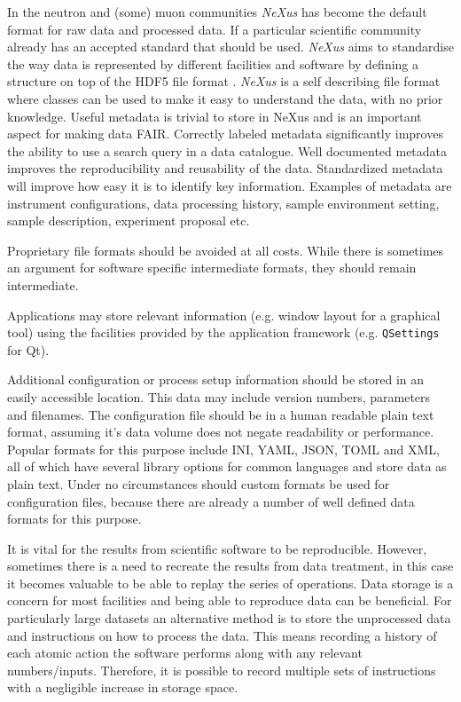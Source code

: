 \documentclass[jnr]{iosart2x}
\begin{document}
In the neutron and (some) muon communities {\it NeXus} \cite{K_nnecke_2015} has become the default format for raw data and processed data.
If a particular scientific community already has an accepted standard that should be used.
{\it NeXus} aims to standardise the way data is represented by different facilities and software by defining a structure on top of the HDF5 file format \cite{HDF5}.
{\it NeXus} is a self describing file format where classes can be used to make it easy to understand the data, with no prior knowledge.
Useful metadata is trivial to store in NeXus and is an important aspect for making data FAIR.
Correctly labeled metadata significantly improves the ability to use a search query in a data catalogue.
Well documented metadata improves the reproducibility and reusability of the data.
Standardized metadata will improve how easy it is to identify key information.
Examples of metadata are instrument configurations, data processing history, sample environment setting, sample description, experiment proposal etc.

Proprietary file formats should be avoided at all costs.
While there is sometimes an argument for software specific intermediate formats, they should remain intermediate.

Applications may store relevant information (e.g. window layout for a graphical tool) using the facilities provided by the application framework (e.g. \texttt{QSettings} for Qt).

Additional configuration or process setup information should be stored in an easily accessible location.
This data may include version numbers, parameters and filenames.
The configuration file should be in a human readable plain text format, assuming it's data volume does not negate readability or performance.
Popular formats for this purpose include INI, YAML, JSON, TOML and XML, all of which have several library options for common languages and store data as plain text.
Under no circumstances should custom formats be used for configuration files, because there are already a number of well defined data formats for this purpose.

It is vital for the results from scientific software to be reproducible.
However, sometimes there is a need to recreate the results from data treatment, in this case it becomes valuable to be able to replay the series of operations.
Data storage is a concern for most facilities and being able to reproduce data can be beneficial.
For particularly large datasets an alternative method is to store the unprocessed data and instructions on how to process the data.
This means recording a history of each atomic action the software performs along with any relevant numbers/inputs.
Therefore, it is possible to record multiple sets of instructions with a negligible increase in storage space.
\end{document}
